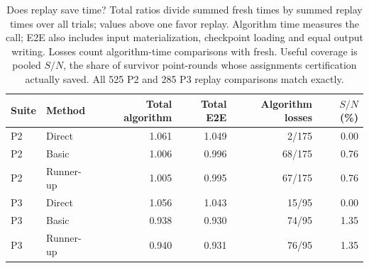\begin{table}[t]
\centering
\caption{Does replay save time? Total ratios divide summed fresh times by summed replay times over all trials; values above one favor replay. Algorithm time measures the call; E2E also includes input materialization, checkpoint loading and equal output writing. Losses count algorithm-time comparisons with fresh. Useful coverage is pooled $S/N$, the share of survivor point-rounds whose assignments certification actually saved. All 525 P2 and 285 P3 replay comparisons match exactly.}
\label{tab:replay-main}
\begin{tabular}{llrrrr}
\toprule
Suite & Method & Total algorithm & Total E2E & Algorithm losses & $S/N$ (\%)\\
\midrule
P2 & Direct & 1.061 & 1.049 & 2/175 & 0.00 \\
P2 & Basic & 1.006 & 0.996 & 68/175 & 0.76 \\
P2 & Runner-up & 1.005 & 0.995 & 67/175 & 0.76 \\
\midrule
P3 & Direct & 1.056 & 1.043 & 15/95 & 0.00 \\
P3 & Basic & 0.938 & 0.930 & 74/95 & 1.35 \\
P3 & Runner-up & 0.940 & 0.931 & 76/95 & 1.35 \\
\bottomrule
\end{tabular}
\end{table}
